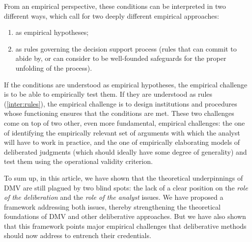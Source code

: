 \documentclass[version=3.21, pagesize, twoside=off, bibliography=totoc, DIV=calc, fontsize=12pt, a4paper, french, english]{scrartcl}
\begin{document}

From an empirical perspective, these conditions can be interpreted in two different ways, which call for two deeply different empirical approaches:
\begin{enumerate}[label=\emph{\roman*}, ref=\emph{\roman*}]
		\item \label{inter:empir} as empirical hypotheses;
	\item \label{inter:rules} as rules governing the decision support process (rules that \thedm{} can commit to abide by, or can consider to be well-founded safeguards for the proper unfolding of the process).
\end{enumerate}

If the conditions are understood as empirical hypotheses, the empirical challenge is to be able to empirically test them. If they are understood as rules (\ref{inter:rules}), the empirical challenge is to design institutions and procedures whose functioning ensures that the conditions are met. These two challenges come on top of two other, even more fundamental, empirical challenges: the one of identifying the empirically relevant set of arguments with which the analyst will have to work in practice, and the one of empirically elaborating models of deliberated judgments (which should ideally have some degree of generality)  and test them using the operational validity criterion.

To sum up, in this article, we have shown that the theoretical underpinnings of \ac{DMV} are still plagued by two blind spots: the lack of a clear position on the \emph{role of the deliberation} and the \emph{role of the analyst} issues. We have proposed a framework addressing both issues, thereby strengthening the theoretical foundations of \ac{DMV} and other deliberative approaches.  But we have also shown that this framework points major empirical challenges that deliberative methods should now address to entrench their credentials.
 
\end{document}
